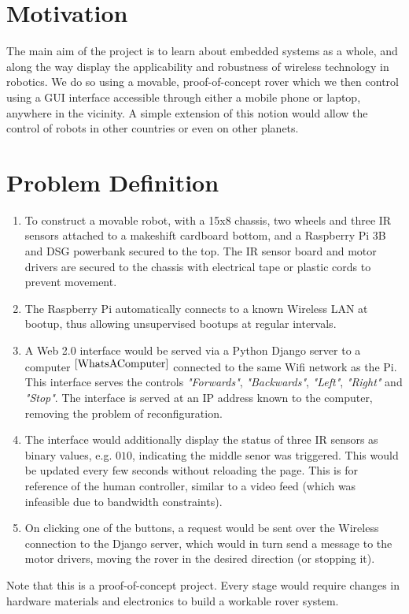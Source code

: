
\section{Motivation}


\quad \quad The main aim of the project is to learn about embedded systems as a whole, and along the way display the applicability and robustness of wireless technology in robotics. We do so using a movable, proof-of-concept rover which we then control using a GUI interface accessible through either a mobile phone or laptop, anywhere in the vicinity. A simple extension of this notion would allow the control of robots in other countries or even on other planets. 


\section{Problem Definition}

\begin{enumerate}
	\item To construct a movable robot, with a 15x8 chassis, two wheels and three IR sensors attached to a makeshift cardboard bottom, and a Raspberry Pi 3B and DSG powerbank secured to the top. The IR sensor board and motor drivers are secured to the chassis with electrical tape or plastic cords to prevent movement.
	
	\item The Raspberry Pi automatically connects to a known Wireless LAN at bootup, thus allowing unsupervised bootups at regular intervals.
	
	\item A Web 2.0 interface would be served via a Python Django server to a computer ${}^{\ref{WhatsAComputer}}$ connected to the same Wifi network as the Pi. This interface serves the controls \textit{"Forwards"}, \textit{"Backwards"}, \textit{"Left"}, \textit{"Right"} and \textit{"Stop"}. The interface is served at an IP address known to the computer, removing the problem of reconfiguration. 

	
	\item The interface would additionally display the status of three IR sensors as binary values, e.g. $010$, indicating the middle senor was triggered. This would be updated every few seconds without reloading the page. This is for reference of the human controller, similar to a video feed (which was infeasible due to bandwidth constraints).
	
	\item On clicking one of the buttons, a request would be sent over the Wireless connection to the Django server, which would in turn send a message to the motor drivers, moving the rover in the desired direction (or stopping it). 

\end{enumerate}

Note that this is a proof-of-concept project. Every stage would require changes in hardware materials and electronics to build a workable rover system.

